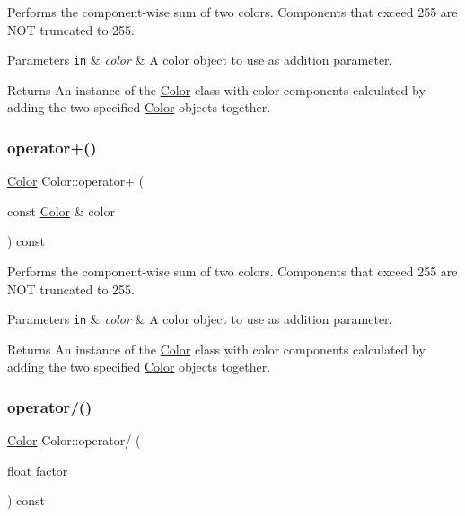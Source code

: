 Performs the component-\/wise sum of two colors. Components that exceed 255 are N\+OT truncated to 255. 


\begin{DoxyParams}[1]{Parameters}
\mbox{\tt in}  & {\em color} & A color object to use as addition parameter.\\
\hline
\end{DoxyParams}
\begin{DoxyReturn}{Returns}
An instance of the \hyperlink{classColor}{Color} class with color components calculated by adding the two specified \hyperlink{classColor}{Color} objects together. 
\end{DoxyReturn}
\mbox{\label{classColor_acd40b26ca2f9217b5cde1e5c1251ef04}} 
\subsubsection{\texorpdfstring{operator+()}{operator+()}\hspace{0.1cm}{\footnotesize\ttfamily [2/2]}}
{\footnotesize\ttfamily \hyperlink{classColor}{Color} Color\+::operator+ (\begin{DoxyParamCaption}\item[{const \hyperlink{classColor}{Color} \&}]{color }\end{DoxyParamCaption}) const}



Performs the component-\/wise sum of two colors. Components that exceed 255 are N\+OT truncated to 255. 


\begin{DoxyParams}[1]{Parameters}
\mbox{\tt in}  & {\em color} & A color object to use as addition parameter.\\
\hline
\end{DoxyParams}
\begin{DoxyReturn}{Returns}
An instance of the \hyperlink{classColor}{Color} class with color components calculated by adding the two specified \hyperlink{classColor}{Color} objects together. 
\end{DoxyReturn}
\mbox{\label{classColor_ac1591338c7f8714e3683cca15ffb2fd3}} 
\subsubsection{\texorpdfstring{operator/()}{operator/()}\hspace{0.1cm}{\footnotesize\ttfamily [1/2]}}
{\footnotesize\ttfamily \hyperlink{classColor}{Color} Color\+::operator/ (\begin{DoxyParamCaption}\item[{float}]{factor }\end{DoxyParamCaption}) const}




